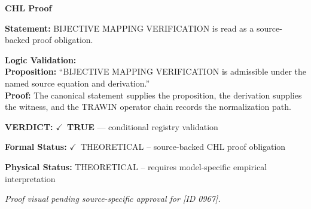\vspace{0.45em}
\noindent\textbf{CHL Proof}\par
\textbf{Statement:} BIJECTIVE MAPPING VERIFICATION is read as a source-backed proof obligation.

\textbf{Logic Validation:}\\
\textbf{Proposition:} ``BIJECTIVE MAPPING VERIFICATION is admissible under the named source equation and derivation.''\\
\textbf{Proof:} The canonical statement supplies the proposition, the derivation supplies the witness, and the TRAWIN operator chain records the normalization path.

\textbf{VERDICT:} \ensuremath{\checkmark}\ \textbf{TRUE} --- conditional registry validation

\textbf{Formal Status:} \ensuremath{\checkmark}\ THEORETICAL -- source-backed CHL proof obligation

\textbf{Physical Status:} THEORETICAL -- requires model-specific empirical interpretation
\par\vspace{0.45em}
\par
\vfill
\begingroup\footnotesize\itshape
Proof visual pending source-specific approval for [ID 0967].
\par\endgroup
\vfill
\endgroup
\endgroup
